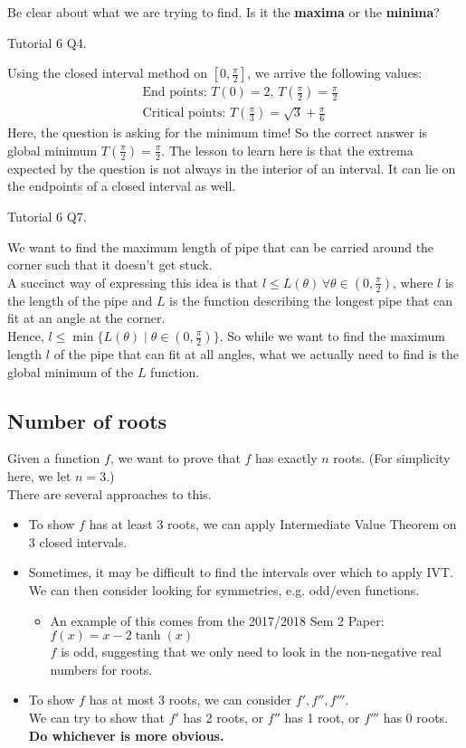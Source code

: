 \documentclass{article}
\begin{document}
Be clear about what we are trying to find. Is it the \textbf{maxima} or the \textbf{minima}?

Tutorial 6 Q4.

Using the closed interval method on $[0,\frac{\pi}{2}]$, we arrive the following values:
\begin{align*}
    &\text{End points: }T(0)=2,\, T(\frac{\pi}{2})=\frac{\pi}{2}\\
    &\text{Critical points: } T(\frac{\pi}{3})=\sqrt{3}+\frac{\pi}{6}
\end{align*}
Here, the question is asking for the minimum time! So the correct answer is global minimum $T(\frac{\pi}{2})=\frac{\pi}{2}$.
The lesson to learn here is that the extrema expected by the question is not always in the interior of an interval. It can lie on the endpoints of a closed interval as well.

Tutorial 6 Q7.

We want to find the maximum length of pipe that can be carried around the corner such that it doesn't get stuck.\\
A succinct way of expressing this idea is that $l\leq L(\theta)\, \forall \theta \in(0,\frac{\pi}{2})$, where $l$ is the length of the pipe and $L$ is the function describing the longest pipe that can fit at an angle at the corner.\\
Hence, $l\leq \min\{L(\theta)\mid \theta \in (0,\frac{\pi}{2})\}$. So while we want to find the maximum length $l$ of the pipe that can fit at all angles, what we actually need to find is the global minimum of the $L$ function.


\subsection{Number of roots}
Given a function $f$, we want to prove that $f$ has exactly $n$ roots. (For simplicity here, we let $n=3$.)\\
There are several approaches to this.
\begin{itemize}
	\item To show $f$ has at least 3 roots, we can apply Intermediate Value Theorem on 3 closed intervals.
	\item Sometimes, it may be difficult to find the intervals over which to apply IVT. We can then consider looking for symmetries, e.g. odd/even functions.
	\begin{itemize}
		\item An example of this comes from the 2017/2018 Sem 2 Paper: $f(x)=x-2\tanh(x)$\\
		$f$ is odd, suggesting that we only need to look in the non-negative real numbers for roots.
	\end{itemize}
	\item To show $f$ has at most 3 roots, we can consider $f', f'',f'''$.\\
	We can try to show that $f'$ has 2 roots, or $f''$ has 1 root, or $f'''$ has 0 roots. \textbf{Do whichever is more obvious.}
\end{itemize}
\end{document}
